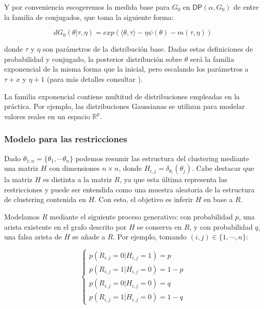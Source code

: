 Y por conveniencia escogeremos la medida base para $G_0$ en $\mathsf{DP}(\alpha, G_0)$ de entre la familia de conjugados, que toma la siguiente forma:

\begin{equation}
d G_0(\theta| \tau, \eta) = exp(\langle \theta, \tau \rangle - \eta\psi(\theta) - m(\tau, \eta))
\label{eqn49}
\end{equation}

donde $\tau$ y $\eta$ son parámetros de la distribución base. Dadas estas definiciones de probabilidad y conjugado, la posterior distribución sobre $\theta$ será la familia exponencial de la misma forma que la inicial, pero escalando los parámetros a $\tau + x$ y $\eta + 1$ (para más detalles consultar \cite{RDPM:2015}).

La familia exponencial contiene multitud de distribuciones empleadas en la práctica. Por ejemplo, las distribuciones Gaussianas se utilizan para modelar valores reales en un espacio $\mathbb{R}^p$. 

\subsubsection{Modelo para las restricciones}

Dado $\theta_{1:n} = \{\theta_1, \cdots \theta_n\}$ podemos resumir las estructura del clustering mediante una matriz $H$ con dimensiones $n\times n$, donde $H_{i,j} = \delta_{\theta_i}(\theta_j)$. Cabe destacar que la matriz $H$ es distinta a la matriz $R$, ya que esta última representa las restricciones y puede ser entendida como una muestra aleatoria de la estructura de clustering contenida en $H$. Con esto, el objetivo es inferir $H$ en base a $R$.

Modelamos $R$ mediante el siguiente proceso generativo: con probabilidad $p$, una arista existente en el grafo descrito por $H$ se conserva en $R$, y con probabilidad $q$, una falsa arista de $H$ se añade a $R$. Por ejemplo, tomando $(i,j) \in \{1, \cdots, n\}$:

\begin{equation}
\begin{cases}
p(R_{i,j} = 0 | H_{i,j} = 1) = p\\
p(R_{i,j} = 1 | H_{i,j} = 0) = 1 - p\\
p(R_{i,j} = 0 | H_{i,j} = 0) = q\\
p(R_{i,j} = 1 | H_{i,j} = 0) = 1 - q
\end{cases}
\label{eqn50}
\end{equation}

